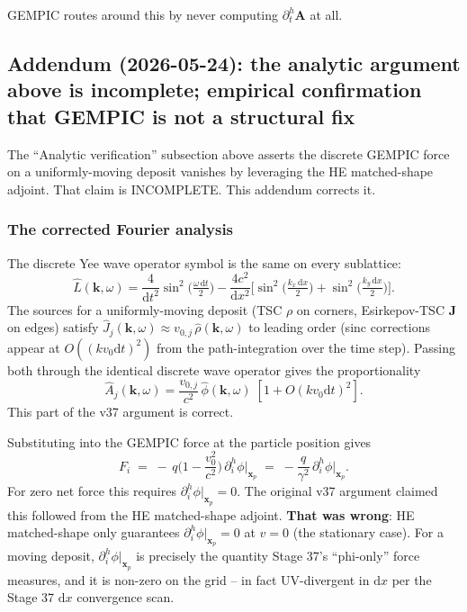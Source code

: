 \documentclass[11pt,a4paper]{article}
\newcommand{\vv}[1]{\mathbf{#1}}
\newcommand{\dd}{\mathrm{d}}
\begin{document}
GEMPIC routes around this by never computing
$\partial^h_t\vv{A}$ at all.

\subsection{Addendum (2026-05-24): the analytic argument above is incomplete; empirical confirmation that GEMPIC is not a structural fix}
\label{sec:gempic_addendum}

The ``Analytic verification'' subsection above asserts the discrete
GEMPIC force on a uniformly-moving deposit vanishes by leveraging the
HE matched-shape adjoint.  That claim is INCOMPLETE.  This addendum
corrects it.

\subsubsection*{The corrected Fourier analysis}

The discrete Yee wave operator symbol is the same on every sublattice:
$$
\hat L(\vv k, \omega)
   = \frac{4}{\dd t^2}\sin^2\!\Big(\tfrac{\omega\,\dd t}{2}\Big)
   - \frac{4 c^2}{\dd x^2}\Big[\sin^2\!\Big(\tfrac{k_x\,\dd x}{2}\Big)
                                  + \sin^2\!\Big(\tfrac{k_y\,\dd x}{2}\Big)\Big].
$$
The sources for a uniformly-moving deposit (TSC $\rho$ on corners,
Esirkepov-TSC $\vv J$ on edges) satisfy
$\hat J_j(\vv k, \omega) \approx v_{0,j}\,\hat\rho(\vv k, \omega)$ to
leading order (sinc corrections appear at $O((k v_0 \dd t)^2)$ from
the path-integration over the time step).  Passing both through the
identical discrete wave operator gives the proportionality
$$
\hat A_j(\vv k, \omega) = \frac{v_{0,j}}{c^2}\,\hat\phi(\vv k, \omega)
                          \;[1 + O(k v_0 \dd t)^2].
$$
This part of the v37 argument is correct.

Substituting into the GEMPIC force at the particle position gives
$$
F_i \;=\; -\,q\Big(1 - \frac{v_0^2}{c^2}\Big)\,\partial^h_i\phi\big|_{\vv x_p}
       \;=\; -\frac{q}{\gamma^2}\,\partial^h_i\phi\big|_{\vv x_p}.
$$
For zero net force this requires
$\partial^h_i\phi|_{\vv x_p} = 0$.  The original v37 argument claimed
this followed from the HE matched-shape adjoint.  \textbf{That was
wrong}: HE matched-shape only guarantees
$\partial^h_i\phi|_{\vv x_p} = 0$ at $v = 0$ (the stationary case).
For a moving deposit, $\partial^h_i\phi|_{\vv x_p}$ is precisely the
quantity Stage 37's ``phi-only'' force measures, and it is non-zero
on the grid -- in fact UV-divergent in $\dd x$ per the Stage 37 $\dd x$
convergence scan.
\end{document}
